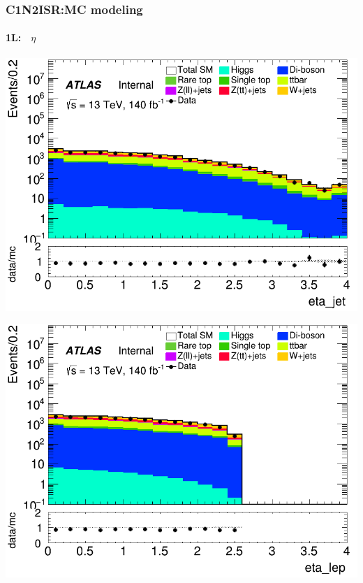 \documentclass[usenames,dvipsnames]{beamer}
\begin{document}
\begin{frame}
\begin{minipage}{0.32\textwidth}
    \end{minipage}
\end{frame}

\begin{frame}
\frametitle{C1N2ISR:MC modeling}
\framesubtitle{1L:$\quad\eta$}
    \begin{minipage}{0.32\textwidth}
        \centering
        \includegraphics[width=\textwidth]{graphics/L_met/L_met_eta_jet.png}
    \end{minipage}
    \hfill
    \begin{minipage}{0.32\textwidth}
        \centering
        \includegraphics[width=\textwidth]{graphics/L_met/L_met_eta_lep.png}
    \end{minipage}
    \hfill
    \begin{minipage}{0.32\textwidth}

\end{minipage}
\end{frame}
\end{document}
